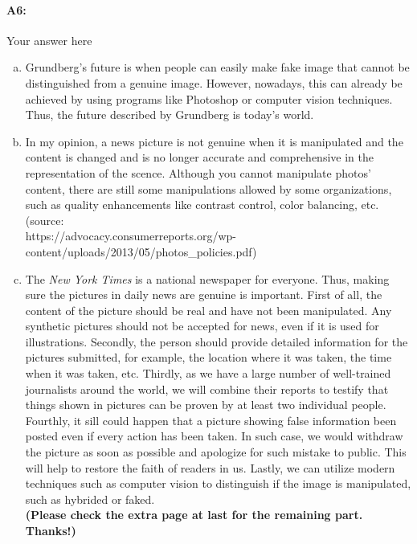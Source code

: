  \paragraph{A6:} Your answer here
\begin{enumerate}[(a)]
\item Grundberg's future is when people can easily make fake image that cannot be distinguished from a genuine image. However, nowadays, this can already be achieved by using programs like Photoshop or computer vision techniques. Thus, the future described by Grundberg is today's world.
\item In my opinion, a news picture is not genuine when it is manipulated and the content is changed and is no longer accurate and comprehensive in the representation of the scence. Although you cannot manipulate photos' content, there are still some manipulations allowed by some organizations, such as quality enhancements like contrast control, color balancing, etc.\\ (source: \\ https://advocacy.consumerreports.org/wp-content/uploads/2013/05/photos\_policies.pdf)
\item The \emph{New York Times} is a national newspaper for everyone. Thus, making sure the pictures in daily news are genuine is important. First of all, the content of the picture should be real and have not been manipulated. Any synthetic pictures should not be accepted for news, even if it is used for illustrations. Secondly, the person should provide detailed information for the pictures submitted, for example, the location where it was taken, the time when it was taken, etc. Thirdly, as we have a large number of well-trained journalists around the world, we will combine their reports to testify that things shown in pictures can be proven by at least two individual people. Fourthly, it sill could happen that a picture showing false information been posted even if every action has been taken. In such case, we would withdraw the picture as soon as possible and apologize for such mistake to public. This will help to restore the faith of readers in us. Lastly, we can utilize modern techniques such as computer vision to distinguish if the image is manipulated, such as hybrided or faked. \\\textbf{(Please check the extra page at last for the remaining part. Thanks!)}
\end{enumerate}



